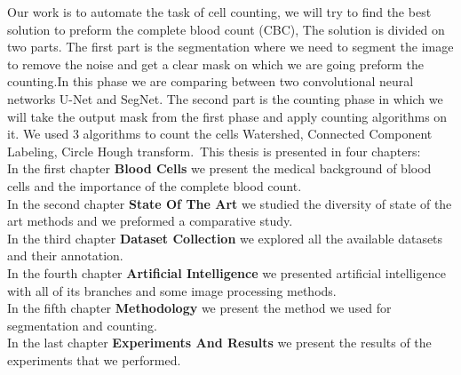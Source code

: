 Our work is to automate the task of cell counting, we will try to find the best solution to preform the complete blood count (CBC), The solution is divided on two parts.
The first part is the segmentation where we need to segment the image to remove the noise and get a clear mask on which we are going preform the counting.In this phase we are comparing between two convolutional neural networks U-Net and SegNet.
The second part is the counting phase in which we will take the output mask from the first phase and apply counting algorithms on it. We used 3 algorithms to count the cells Watershed, Connected Component Labeling, Circle Hough transform.\
This thesis is presented in four chapters:\\
In the first chapter \textbf{Blood Cells} we present the medical background of blood cells and the importance of the complete blood count.\\
In the second chapter \textbf{State Of The Art} we studied the diversity of state of the art methods and we preformed a comparative study.\\
In the third chapter \textbf{Dataset Collection} we explored all the available datasets and their annotation.\\
In the fourth chapter \textbf{Artificial Intelligence} we presented artificial intelligence with all of its branches and some image processing methods.\\
In the fifth chapter \textbf{Methodology} we present the method we used for segmentation and counting.\\
In the last chapter \textbf{Experiments And Results} we present the results of the experiments that we performed.

